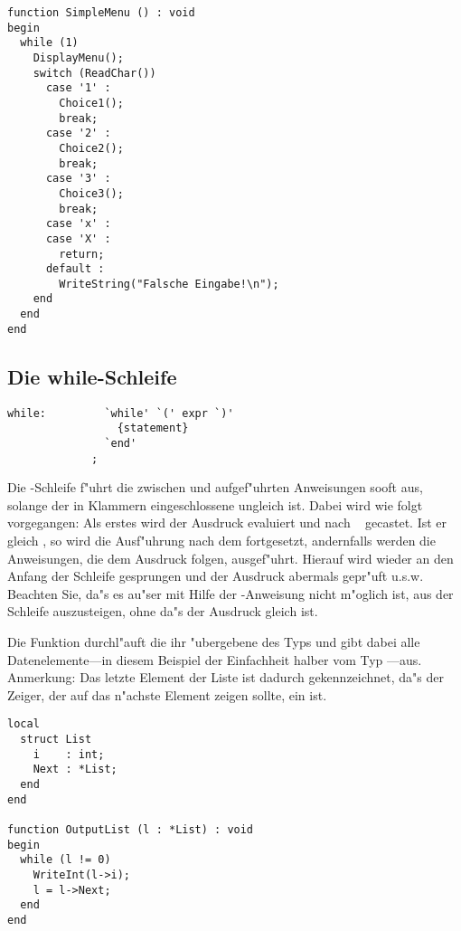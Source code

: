 \begin{verbatim}
function SimpleMenu () : void
begin
  while (1)
    DisplayMenu();
    switch (ReadChar())
      case '1' :
        Choice1();
        break;
      case '2' :
        Choice2();
        break;
      case '3' :
        Choice3();
        break;
      case 'x' :
      case 'X' :
        return;
      default :
        WriteString("Falsche Eingabe!\n");
    end
  end
end
\end{verbatim}
        
\subsection{Die while-Schleife}

\begin{verbatim}
while:         `while' `(' expr `)'
                 {statement}
               `end'
             ;
\end{verbatim}

Die -Schleife f"uhrt die zwischen  und
 aufgef"uhrten Anweisungen sooft aus, solange der in Klammern
eingeschlossene  ungleich  ist. Dabei wird wie
folgt vorgegangen: Als erstes wird der Ausdruck evaluiert und
nach \tint\
gecastet. Ist er
gleich , so wird die Ausf"uhrung nach dem 
fortgesetzt, andernfalls werden die Anweisungen, die dem Ausdruck
folgen, ausgef"uhrt. Hierauf wird wieder an den Anfang der
Schleife gesprungen und der Ausdruck abermals gepr"uft u.s.w.
Beachten Sie, da"s es au"ser mit Hilfe der -Anweisung
nicht m"oglich ist, aus der Schleife auszusteigen, ohne da"s der
Ausdruck gleich \fu{0} ist.

\example
Die Funktion  durchl"auft die ihr "ubergebene
 des Typs 
und gibt dabei alle Datenelemente---in
diesem Beispiel der Einfachheit halber vom Typ \tint ---aus.
Anmerkung: Das letzte Element der Liste ist dadurch
gekennzeichnet, da"s der Zeiger, der auf das n"achste Element
zeigen sollte, ein  ist.

\begin{verbatim}
local
  struct List
    i    : int;
    Next : *List;
  end
end

function OutputList (l : *List) : void
begin
  while (l != 0)
    WriteInt(l->i);
    l = l->Next;
  end
end
\end{verbatim}

